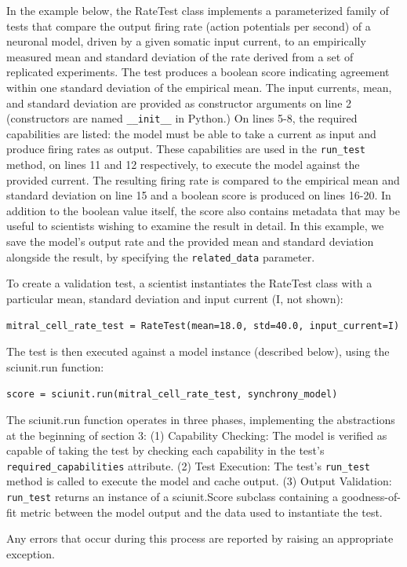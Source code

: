 \documentclass[11pt,letterpaper]{article}
\begin{document}
In the example below, the RateTest class implements a parameterized family of tests that compare the output firing rate (action potentials per second) of a neuronal model, driven by a given somatic input current, to an empirically measured mean and standard deviation of the rate derived from a set of replicated experiments. The test produces a boolean score indicating agreement within one standard deviation of the empirical mean. The input currents, mean, and standard deviation are provided as constructor arguments on line 2 (constructors are named \verb|__init__| in Python.) On lines 5-8, the required capabilities are listed: the model must be able to take a current as input and produce firing rates as output. These capabilities are used in the \verb|run_test| method, on lines 11 and 12 respectively, to execute the model against the provided current. The resulting firing rate is compared to the empirical mean and standard deviation on line 15 and a boolean score is produced on lines 16-20. In addition to the boolean value itself, the score also contains metadata that may be useful to scientists wishing to examine the result in detail. In this example, we save the model's output rate and the provided mean and standard deviation alongside the result, by specifying the \verb|related_data| parameter.

To create a validation test, a scientist instantiates the RateTest class with a particular mean, standard deviation and input current (I, not shown):

\verb|mitral_cell_rate_test = RateTest(mean=18.0, std=40.0, input_current=I)|

The test is then executed against a model instance (described below), using the sciunit.run function:

\verb|score = sciunit.run(mitral_cell_rate_test, synchrony_model)|

The sciunit.run function operates in three phases, implementing the abstractions at the beginning of section 3:
(1)	Capability Checking: The model is verified as capable of taking the test by checking each capability in the test's \verb|required_capabilities| attribute.
(2)	Test Execution: The test's \verb|run_test| method is called to execute the model and cache output.
(3)	Output Validation: \verb|run_test| returns an instance of a sciunit.Score subclass containing a goodness-of-fit metric between the model output and the data used to instantiate the test.

Any errors that occur during this process are reported by raising an appropriate exception.
\end{document}
